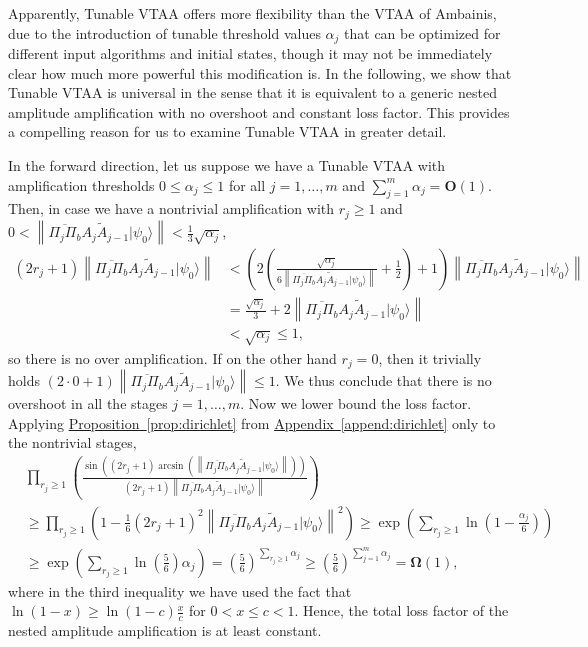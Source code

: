 \documentclass[letterpaper,onecolumn,11pt,accepted=2026-02-14]{quantumarticle}
\newcommand{\norm}[1]{\left\lVert#1\right\rVert}
\theoremstyle{remark}
\theoremstyle{plain}
\newcommand{\prop}[1]{\hyperref[prop:#1]{Proposition~\ref*{prop:#1}}}
\newcommand{\append}[1]{\hyperref[append:#1]{Appendix~\ref*{append:#1}}}
\newcommand{\ket}[1]{|#1\rangle}
\begin{document}
Apparently, Tunable VTAA offers more flexibility than the VTAA of Ambainis, due to the introduction of tunable threshold values $\alpha_j$ that can be optimized for different input algorithms and initial states, though it may not be immediately clear how much more powerful this modification is. In the following, we show that Tunable VTAA is universal in the sense that it is equivalent to a generic nested amplitude amplification with no overshoot and constant loss factor. This provides a compelling reason for us to examine Tunable VTAA in greater detail.

In the forward direction, let us suppose we have a Tunable VTAA with amplification thresholds $0\leq\alpha_j\leq1$ for all $j=1,\ldots,m$ and $\sum_{j=1}^m\alpha_j=\mathbf{O}(1)$. Then, in case we have a nontrivial amplification with $r_j\geq1$ and $0<\norm{\overline{\Pi_j\Pi_b}A_j\widetilde A_{j-1}\ket{\psi_0}}<\frac{1}{3}\sqrt{\alpha_j}$,
\begin{equation}
\begin{aligned}
    (2r_j+1)\norm{\overline{\Pi_j\Pi_b}A_j\widetilde A_{j-1}\ket{\psi_0}}
    &<\left(2\left(\frac{\sqrt{\alpha_j}}{6\norm{\overline{\Pi_j\Pi_b}A_j\widetilde A_{j-1}\ket{\psi_0}}}+\frac{1}{2}\right)+1\right)\norm{\overline{\Pi_j\Pi_b}A_j\widetilde A_{j-1}\ket{\psi_0}}\\
    &=\frac{\sqrt{\alpha_j}}{3}+2\norm{\overline{\Pi_j\Pi_b}A_j\widetilde A_{j-1}\ket{\psi_0}}\\
    &<\sqrt{\alpha_j}\leq 1,
\end{aligned}
\end{equation}
so there is no over amplification. If on the other hand $r_j=0$, then it trivially holds $(2\cdot0+1)\norm{\overline{\Pi_j\Pi_b}A_j\widetilde A_{j-1}\ket{\psi_0}}\leq 1$. We thus conclude that there is no overshoot in all the stages $j=1,\ldots,m$.
Now we lower bound the loss factor. Applying \prop{dirichlet} from \append{dirichlet} only to the nontrivial stages,
\begin{equation}
\begin{aligned}
    &\prod_{r_j\geq1}\left(\frac{\sin\left((2r_j+1)\arcsin\left(\norm{\overline{\Pi_j\Pi_b}A_j\widetilde A_{j-1}\ket{\psi_0}}\right)\right)}{(2r_j+1)\norm{\overline{\Pi_j\Pi_b}A_j\widetilde A_{j-1}\ket{\psi_0}}}\right)\\
    &\geq\prod_{r_j\geq1}\left(1-\frac{1}{6}(2r_j+1)^2\norm{\overline{\Pi_j\Pi_b}A_j\widetilde A_{j-1}\ket{\psi_0}}^2\right)
    \geq\exp\left(\sum_{r_j\geq1}\ln\left(1-\frac{\alpha_j}{6}\right)\right)\\
    &\geq\exp\left(\sum_{r_j\geq1}\ln\left(\frac{5}{6}\right)\alpha_j\right)
    =\left(\frac{5}{6}\right)^{\sum\limits_{r_j\geq1}\alpha_j}
    \geq\left(\frac{5}{6}\right)^{\sum_{j=1}^m\alpha_j}
    =\mathbf{\Omega}(1),
\end{aligned}
\end{equation}
where in the third inequality we have used the fact that $\ln(1-x)\geq\ln(1-c)\frac{x}{c}$ for $0<x\leq c<1$. Hence, the total loss factor of the nested amplitude amplification is at least constant.
\end{document}
